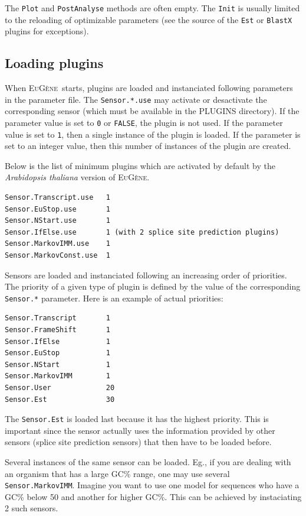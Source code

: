 \documentclass[a4paper,titlepage]{report}
\newcommand{\EuGene}{\textsc{EuG\`ene}}
\begin{document}
The \texttt{Plot} and \texttt{PostAnalyse} methods are often empty.
The \texttt{Init} is usually limited to the reloading of optimizable
parameters (see the source of the \texttt{Est} or \texttt{BlastX}
plugins for exceptions).

\subsection{Loading plugins}

When \EuGene\ starts, plugins are loaded and instanciated following
parameters in the parameter file. The \texttt{Sensor.*.use} may
activate or desactivate the corresponding sensor (which must be
available in the PLUGINS directory). If the parameter value is set to
\texttt{0} or \texttt{FALSE}, the plugin is not used. If the parameter
value is set to \texttt{1}, then a single instance of the plugin is
loaded. If the parameter is set to an integer value, then this number
of instances of the plugin are created.

Below is the list of minimum plugins which are activated by default by
the \emph{Arabidopsis thaliana} version of \EuGene.

\begin{Verbatim}
Sensor.Transcript.use   1
Sensor.EuStop.use       1
Sensor.NStart.use       1
Sensor.IfElse.use       1 (with 2 splice site prediction plugins)
Sensor.MarkovIMM.use    1
Sensor.MarkovConst.use  1
\end{Verbatim}  

Sensors are loaded and instanciated following an increasing order of
priorities. The priority of a given type of plugin is defined by the
value of the corresponding \texttt{Sensor.*} parameter. Here is an
example of actual priorities:

\begin{Verbatim}
Sensor.Transcript       1
Sensor.FrameShift       1
Sensor.IfElse           1
Sensor.EuStop           1       
Sensor.NStart           1       
Sensor.MarkovIMM        1 
Sensor.User             20
Sensor.Est              30         
\end{Verbatim}

The \texttt{Sensor.Est} is loaded last because it has the highest
priority.  This is important since the sensor actually uses the
information provided by other sensors (splice site prediction sensors)
that then have to be loaded before.

Several instances of the same sensor can be loaded. Eg., if you are
dealing with an organism that has a large GC\% range, one may use
several \texttt{Sensor.MarkovIMM}. Imagine you want to use one model
for sequences who have a GC\% below 50 and another for higher GC\%.
This can be achieved by instaciating 2 such sensors. 
\end{document}
